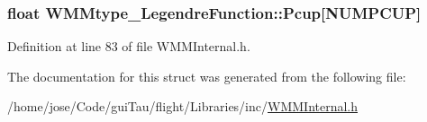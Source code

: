 \hypertarget{struct_w_m_mtype___legendre_function_a3059147ef5db575cff502086ffd6181e}{
\subsubsection[{Pcup}]{\setlength{\rightskip}{0pt plus 5cm}float W\-M\-Mtype\-\_\-\-Legendre\-Function\-::\-Pcup\mbox{[}N\-U\-M\-P\-C\-U\-P\mbox{]}}}\label{struct_w_m_mtype___legendre_function_a3059147ef5db575cff502086ffd6181e}


Definition at line 83 of file W\-M\-M\-Internal.\-h.



The documentation for this struct was generated from the following file\-:\begin{DoxyCompactItemize}
\item 
/home/jose/\-Code/gui\-Tau/flight/\-Libraries/inc/\hyperlink{_w_m_m_internal_8h}{W\-M\-M\-Internal.\-h}\end{DoxyCompactItemize}
